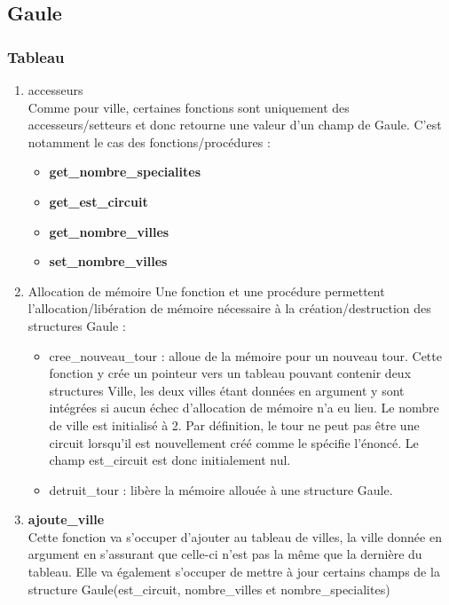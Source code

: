 \documentclass[a4paper, 11pt, oneside]{article}
\begin{document}
\subsection{\textbf{Gaule}}
\subsubsection{Tableau}
\begin{enumerate}
    \item accesseurs
    \\Comme pour ville, certaines fonctions sont uniquement des accesseurs/setteurs 
    et donc retourne une valeur d'un champ de Gaule. C'est notamment le cas des 
    fonctions/procédures : 
    \begin{itemize}
    \item \textbf{get\_nombre\_specialites} 
    \item \textbf{get\_est\_circuit} 
    \item \textbf{get\_nombre\_villes}
    \item \textbf{set\_nombre\_villes}
    \end{itemize}   
    \item Allocation de mémoire
    Une fonction et une procédure permettent l'allocation/libération de mémoire nécessaire à la 
    création/destruction des structures Gaule : 
    \begin{itemize}
        \item cree\_nouveau\_tour : alloue de la mémoire pour un nouveau tour. Cette fonction y crée 
        un pointeur vers un tableau pouvant contenir deux structures Ville, les deux villes étant données en argument y sont 
        intégrées si aucun échec d'allocation de mémoire n'a eu lieu. Le nombre de ville est initialisé à 2. 
        Par définition, le tour ne peut pas être une circuit lorsqu'il est nouvellement créé comme le spécifie l'énoncé. 
        Le champ est\_circuit est donc initialement nul.
        \item detruit\_tour : libère la mémoire allouée à une structure Gaule.
    \end{itemize}
    \item \textbf{ajoute\_ville}
    \\Cette fonction va s'occuper d'ajouter au tableau de villes, la ville donnée en argument 
    en s'assurant que celle-ci n'est pas la même que la dernière du tableau. Elle va également 
    s'occuper de mettre à jour certains champs de la structure Gaule(est\_circuit, nombre\_villes et 
    nombre\_specialites)

\end{enumerate}
\end{document}
